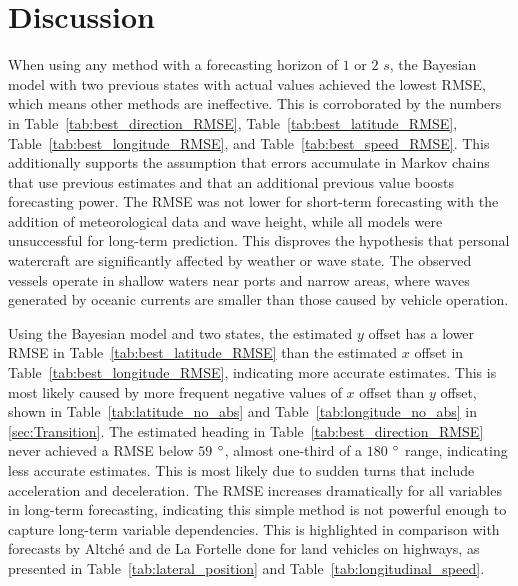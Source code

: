 \documentclass[preprint,12pt]{elsarticle}
\begin{document}
\section{Discussion}
\label{sec:Discussion}

When using any method with a forecasting horizon of $1$ or $2$ $s$, the Bayesian model with two previous states with actual values achieved the lowest RMSE, which means other methods are ineffective. This is corroborated by the numbers in Table~\ref{tab:best_direction_RMSE}, Table~\ref{tab:best_latitude_RMSE}, Table~\ref{tab:best_longitude_RMSE}, and Table~\ref{tab:best_speed_RMSE}. This additionally supports the assumption that errors accumulate in Markov chains that use previous estimates and that an additional previous value boosts forecasting power. The RMSE was not lower for short-term forecasting with the addition of meteorological data and wave height, while all models were unsuccessful for long-term prediction. This disproves the hypothesis that personal watercraft are significantly affected by weather or wave state. The observed vessels operate in shallow waters near ports and narrow areas, where waves generated by oceanic currents are smaller than those caused by vehicle operation. 

Using the Bayesian model and two states, the estimated $y$ offset has a lower RMSE in Table~\ref{tab:best_latitude_RMSE} than the estimated $x$ offset in Table~\ref{tab:best_longitude_RMSE}, indicating more accurate estimates. This is most likely caused by more frequent negative values of $x$ offset than $y$ offset, shown in Table~\ref{tab:latitude_no_abs}  and Table~\ref{tab:longitude_no_abs} in \ref{sec:Transition}. The estimated heading in Table~\ref{tab:best_direction_RMSE} never achieved a RMSE below $59$ $\degree$, almost one-third of a $180$ $\degree$ range, indicating less accurate estimates. This is most likely due to sudden turns that include acceleration and deceleration. The RMSE increases dramatically for all variables in long-term forecasting, indicating this simple method is not powerful enough to capture long-term variable dependencies. This is highlighted in comparison with forecasts by Altché and de La Fortelle done for land vehicles on highways, as presented in Table~\ref{tab:lateral_position} and Table~\ref{tab:longitudinal_speed}.
\end{document}
